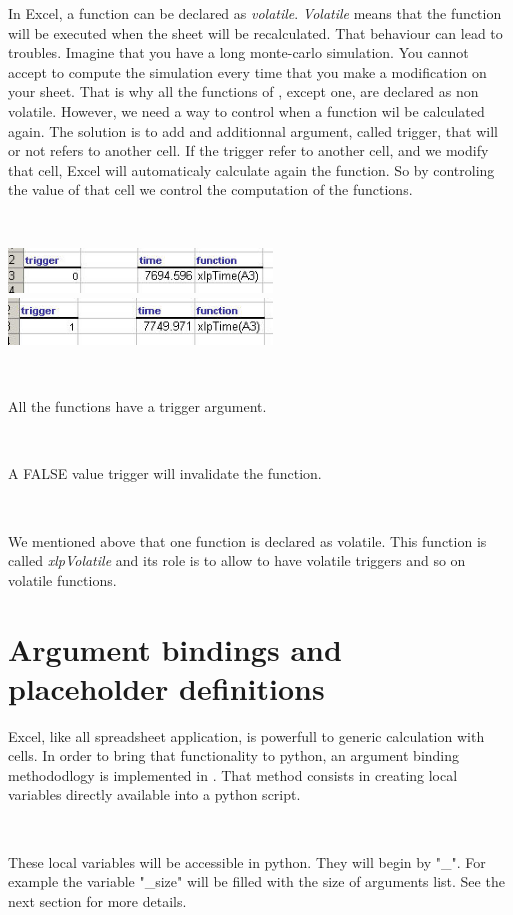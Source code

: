 In Excel, a function can be declared as {\it volatile}. {\it Volatile} means that the function will be executed when the sheet will be recalculated. That behaviour can lead to troubles. Imagine that you have a long monte-carlo simulation. You cannot accept to compute the simulation every time that you make a modification on your sheet. That is why all the functions of \xlp, except one, are declared as non volatile. However, we need a way to control when a function wil be calculated again. The solution is to add and additionnal argument, called trigger, that will or not refers to another cell. If the trigger refer to another cell, and we modify that cell, Excel will automaticaly calculate again the function. So by controling the value of that cell we control the computation of the functions.


\

\includegraphics[width=7cm]{images/trigger1.jpg} \hfill \includegraphics[width=7cm]{images/trigger2.jpg}

\

All the \xlp functions have a trigger argument.

\

A FALSE value trigger will invalidate the function.

\

We mentioned above that one function is declared as volatile. This function is called {\sl xlpVolatile} and its role is to allow to have volatile triggers and so on volatile functions. 

\section{Argument bindings and placeholder definitions}

Excel, like all spreadsheet application, is powerfull to generic calculation with cells. In order to bring that functionality to python, an argument binding methododlogy is implemented in \xlp. That method consists in creating local variables directly available into a python script.  

\

These local variables will be accessible in python. They will begin by "\_". For example the variable "\_size" will be filled with the size of arguments list. See the next section for more details.

